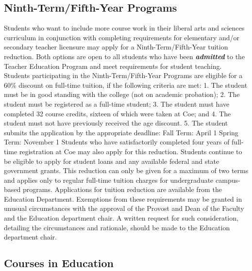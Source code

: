 \documentclass[
  letterpaper,
]{scrbook}
\begin{document}
\hypertarget{ninth-termfifth-year-programs}{%
\subsection{Ninth-Term/Fifth-Year
Programs}\label{ninth-termfifth-year-programs}}

Students who want to include more course work in their liberal arts and
sciences curriculum in conjunction with completing requirements for
elementary and/or secondary teacher licensure may apply for a
Ninth-Term/Fifth-Year tuition reduction. Both options are open to all
students who have been \textbf{\emph{admitted}} to the Teacher Education
Program and meet requirements for student teaching. Students
participating in the Ninth-Term/Fifth-Year Programs are eligible for a
60\% discount on full-time tuition, if the following criteria are met:
1. The student must be in good standing with the college (not on
academic probation); 2. The student must be registered as a full-time
student; 3. The student must have completed 32 course credits, sixteen
of which were taken at Coe; and 4. The student must not have previously
received the age discount. 5. The student submits the application by the
appropriate deadline: Fall Term: April 1 Spring Term: November 1
Students who have satisfactorily completed four years of full-time
registration at Coe may also apply for this reduction. Students continue
to be eligible to apply for student loans and any available federal and
state government grants. This reduction can only be given for a maximum
of two terms and applies only to regular full-time tuition charges for
undergraduate campus-based programs. Applications for tuition reduction
are available from the Education Department. Exemptions from these
requirements may be granted in unusual circumstances with the approval
of the Provost and Dean of the Faculty and the Education department
chair. A written request for such consideration, detailing the
circumstances and rationale, should be made to the Education department
chair.

\hypertarget{courses-in-education}{%
\subsection{Courses in Education}\label{courses-in-education}}
\end{document}

